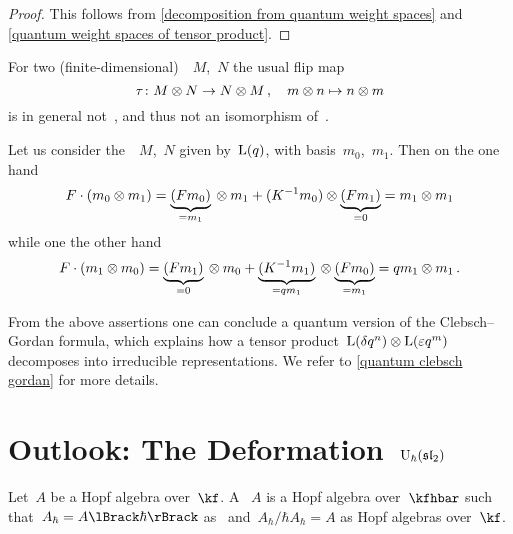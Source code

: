 \documentclass[a4paper, 11pt, oneside]{scrartcl}
\begin{document}
\begin{proof}
  This follows from \cref{decomposition from quantum weight spaces} and \cref{quantum weight spaces of tensor product}.
\end{proof}

\begin{warning}
  For two (finite-dimensional)~~$M$,~$N$ the usual flip map
  \[
    \tau
    \colon
    M \otimes N
    \to
    N \otimes M \,,
    \quad
    m \otimes n
    \mapsto
    n \otimes m
  \]
  is in general not~, and thus not an isomorphism of~.
\end{warning}

\begin{example}
  Let us consider the~~$M$,~$N$ given by~$\operatorname{L}(q)$, with basis~$m_0$,~$m_1$.
  Then on the one hand
  \[
    F \cdot (m_0 \otimes m_1)
    =
    \underbrace{ (F m_0) }_{= m_1} {} \otimes m_1
    +
    (K^{-1} m_0) \otimes \underbrace{(F m_1) }_{= 0}
    =
    m_1 \otimes m_1
  \]
  while one the other hand
  \[
    F \cdot (m_1 \otimes m_0)
    =
    \underbrace{ (F m_1) }_{= 0} {} \otimes m_0
    +
    \underbrace{ (K^{-1} m_1) }_{= q m_1} {} \otimes \underbrace{ (F m_0) }_{= m_1}
    =
    q m_1 \otimes m_1 \,.
  \]
\end{example}

From the above assertions one can conclude a quantum version of the Clebsch--Gordan formula, which explains how a tensor product~$\operatorname{L}(\delta q^n) \otimes \operatorname{L}(\varepsilon q^m)$ decomposes into irreducible representations.
We refer to \cref{quantum clebsch gordan} for more details.




\section{Outlook: The Deformation~\texorpdfstring{$\operatorname{U}_{\hbar}(\mathfrak{sl}_2)$}{Uh(sl2)}}

\begin{definition}
  Let~$A$ be a Hopf algebra over~$\kf$.
  A ~$A$ is a Hopf algebra over~$\kfhbar$ such that~$A_\hbar = \power{A}{\hbar}$ as~\modules{$\kfhbar$} and~$A_\hbar / \hbar A_\hbar = A$ as Hopf algebras over~$\kf$.
\end{definition}
\end{document}
